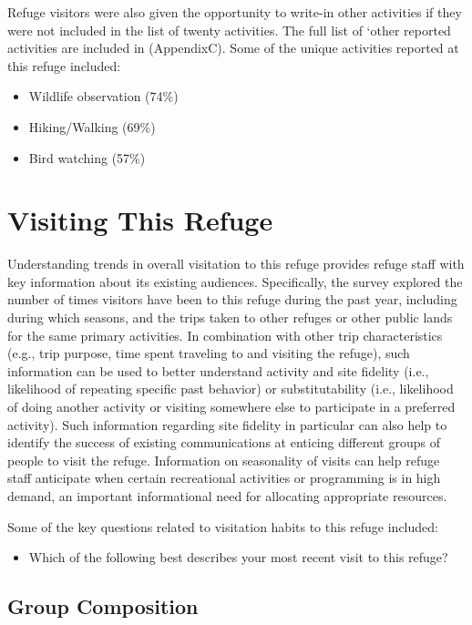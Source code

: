 \documentclass[]{book}
\providecommand{\tightlist}{%
  \setlength{\itemsep}{0pt}\setlength{\parskip}{0pt}}
\let\BeginKnitrBlock\begin \let\EndKnitrBlock\end
\begin{document}
Refuge visitors were also given the opportunity to write-in other
activities if they were not included in the list of twenty activities.
The full list of `other reported activities are included in (AppendixC).
Some of the unique activities reported at this refuge included:

\begin{itemize}
\tightlist
\item
  Wildlife observation (74\%)
\item
  Hiking/Walking (69\%)
\item
  Bird watching (57\%)
\end{itemize}

\section{Visiting This Refuge}\label{visiting-this-refuge}

\BeginKnitrBlock{heading4}
Understanding trends in overall visitation to this refuge provides
refuge staff with key information about its existing audiences.
Specifically, the survey explored the number of times visitors have been
to this refuge during the past year, including during which seasons, and
the trips taken to other refuges or other public lands for the same
primary activities. In combination with other trip characteristics
(e.g., trip purpose, time spent traveling to and visiting the refuge),
such information can be used to better understand activity and site
fidelity (i.e., likelihood of repeating specific past behavior) or
substitutability (i.e., likelihood of doing another activity or visiting
somewhere else to participate in a preferred activity). Such information
regarding site fidelity in particular can also help to identify the
success of existing communications at enticing different groups of
people to visit the refuge. Information on seasonality of visits can
help refuge staff anticipate when certain recreational activities or
programming is in high demand, an important informational need for
allocating appropriate resources.
\EndKnitrBlock{heading4}

Some of the key questions related to visitation habits to this refuge
included:

\begin{itemize}
\tightlist
\item
  Which of the following best describes your most recent visit to this
  refuge?
\end{itemize}

\subsection*{Group Composition}\label{group-composition}
\end{document}
